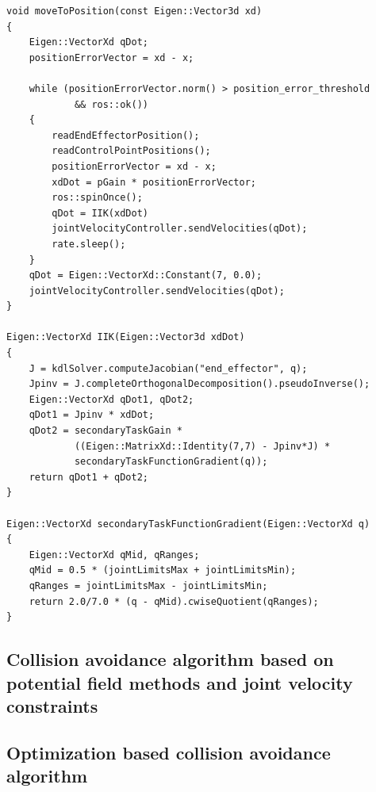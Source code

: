 \begin{lstlisting}[caption={CartesianPositionController.cpp},captionpos=b]
void moveToPosition(const Eigen::Vector3d xd)
{
    Eigen::VectorXd qDot;
    positionErrorVector = xd - x;

    while (positionErrorVector.norm() > position_error_threshold
            && ros::ok())
    {
        readEndEffectorPosition();
        readControlPointPositions();
        positionErrorVector = xd - x;
        xdDot = pGain * positionErrorVector;
        ros::spinOnce();
        qDot = IIK(xdDot)
        jointVelocityController.sendVelocities(qDot);
        rate.sleep();
    }
    qDot = Eigen::VectorXd::Constant(7, 0.0);
    jointVelocityController.sendVelocities(qDot);
}

Eigen::VectorXd IIK(Eigen::Vector3d xdDot)
{
    J = kdlSolver.computeJacobian("end_effector", q);
    Jpinv = J.completeOrthogonalDecomposition().pseudoInverse();
    Eigen::VectorXd qDot1, qDot2;
    qDot1 = Jpinv * xdDot;
    qDot2 = secondaryTaskGain *
            ((Eigen::MatrixXd::Identity(7,7) - Jpinv*J) *
            secondaryTaskFunctionGradient(q));
    return qDot1 + qDot2;
}

Eigen::VectorXd secondaryTaskFunctionGradient(Eigen::VectorXd q)
{
    Eigen::VectorXd qMid, qRanges;
    qMid = 0.5 * (jointLimitsMax + jointLimitsMin);
    qRanges = jointLimitsMax - jointLimitsMin;
    return 2.0/7.0 * (q - qMid).cwiseQuotient(qRanges);
}
\end{lstlisting}

\subsection{Collision avoidance algorithm based on potential field methods and joint velocity constraints}

\subsection{Optimization based collision avoidance algorithm}

